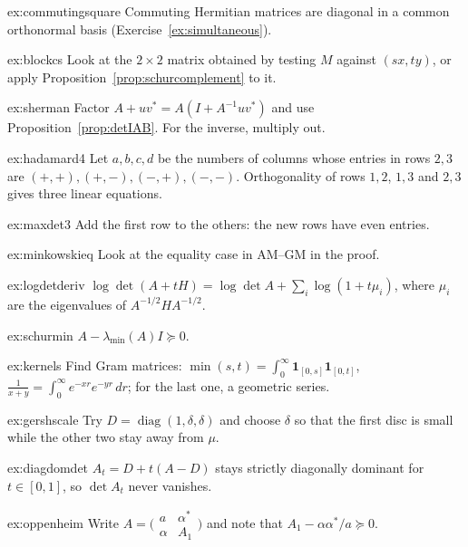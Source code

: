 \begin{hint}{ex:commutingsquare}
Commuting Hermitian matrices are diagonal in a common orthonormal basis (Exercise~\ref{ex:simultaneous}).
\end{hint}
\begin{hint}{ex:blockcs}
Look at the $2\times2$ matrix obtained by testing $M$ against $(sx,ty)$, or apply Proposition~\ref{prop:schurcomplement} to it.
\end{hint}
\begin{hint}{ex:sherman}
Factor $A+uv^*=A(I+A^{-1}uv^*)$ and use Proposition~\ref{prop:detIAB}. For the inverse, multiply out.
\end{hint}
\begin{hint}{ex:hadamard4}
Let $a,b,c,d$ be the numbers of columns whose entries in rows $2,3$ are $(+,+),(+,-),(-,+),(-,-)$. Orthogonality of rows $1,2$, $1,3$ and
$2,3$ gives three linear equations.
\end{hint}
\begin{hint}{ex:maxdet3}
Add the first row to the others: the new rows have even entries.
\end{hint}
\begin{hint}{ex:minkowskieq}
Look at the equality case in AM--GM in the proof.
\end{hint}
\begin{hint}{ex:logdetderiv}
$\log\det(A+tH)=\log\det A+\sum_i\log(1+t\mu_i)$, where $\mu_i$ are the eigenvalues of $A^{-1/2}HA^{-1/2}$.
\end{hint}
\begin{hint}{ex:schurmin}
$A-\lambda_{\min}(A)I\succeq0$.
\end{hint}
\begin{hint}{ex:kernels}
Find Gram matrices: $\min(s,t)=\int_0^\infty\mathbf 1_{[0,s]}\mathbf 1_{[0,t]}$, $\frac1{x+y}=\int_0^\infty e^{-xr}e^{-yr}\,dr$; for the last one,
a geometric series.
\end{hint}
\begin{hint}{ex:gershscale}
Try $D=\operatorname{diag}(1,\delta,\delta)$ and choose $\delta$ so that the first disc is small while the other two stay away from $\mu$.
\end{hint}
\begin{hint}{ex:diagdomdet}
$A_t=D+t(A-D)$ stays strictly diagonally dominant for $t\in[0,1]$, so $\det A_t$ never vanishes.
\end{hint}
\begin{hint}{ex:oppenheim}
Write $A=\bigl(\begin{smallmatrix}a&\alpha^*\\\alpha&A_1\end{smallmatrix}\bigr)$ and note that $A_1-\alpha\alpha^*/a\succeq0$.
\end{hint}


